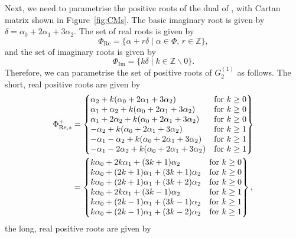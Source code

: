 \documentclass[10pt,a4paper]{amsart}
\numberwithin{equation}{section}
\theoremstyle{definition}
\newcommand{\Z}{\mathbb{Z}}
\begin{document}
Next, we need to parametrise the positive roots of the dual  of , with Cartan matrix shown in Figure~\ref{fig:CMs}. The basic imaginary root is given by $\delta = \alpha_0 + 2\alpha_1 + 3\alpha_2$. The set of real roots is given by
\[
\Phi_{\mathrm{Re}} = \{\alpha + r\delta \mid \alpha\in\Phi,\, r\in \Z\},
\]
and the set of imaginary roots is given by
\[
\Phi_{\mathrm{Im}} = \{k\delta \mid k\in \Z \backslash 0\}.
\]
Therefore, we can parametrise the set of positive roots of $G_2^{(1)}$ as follows. The short, real positive roots are given by
\begin{align*}
\Phi_{\mathrm{Re},s}^{+} &=
\left\{
\begin{array}{@{}ll@{}}
 \alpha_2 + k(\alpha_0 + 2\alpha_1 + 3\alpha_2) & \text{for} \ k \geq 0 \\
 \alpha_1 + \alpha_2 + k(\alpha_0 + 2\alpha_1 + 3\alpha_2) & \text{for} \  k \geq 0 \\
 \alpha_1 + 2\alpha_2 + k(\alpha_0 + 2\alpha_1 + 3\alpha_2) & \text{for} \  k \geq 0 \\
 -\alpha_2 + k(\alpha_0 + 2\alpha_1 + 3\alpha_2) & \text{for} \  k \geq 1 \\
 -\alpha_1 - \alpha_2 + k(\alpha_0 + 2\alpha_1 + 3\alpha_2) & \text{for} \  k \geq 1 \\
 -\alpha_1 - 2\alpha_2 + k(\alpha_0 + 2\alpha_1 + 3\alpha_2) & \text{for} \  k \geq 1
\end{array}
\right\} \\
&=
\left\{
\begin{array}{@{}ll@{}}
 k\alpha_0 + 2k\alpha_1 + (3k+1)\alpha_2 & \text{for} \  k \geq 0 \\
 k\alpha_0 + (2k+1)\alpha_1 + (3k+1)\alpha_2 & \text{for} \  k \geq 0 \\
 k\alpha_0 + (2k+1)\alpha_1 + (3k+2)\alpha_2 & \text{for} \  k \geq 0 \\
 k\alpha_0 + 2k\alpha_1 + (3k-1)\alpha_2 & \text{for} \  k \geq 1 \\
 k\alpha_0 + (2k-1)\alpha_1 + (3k-1)\alpha_2 & \text{for} \  k \geq 1 \\
 k\alpha_0 + (2k-1)\alpha_1 + (3k-2)\alpha_2 & \text{for} \  k \geq 1
\end{array}
\right\},
\end{align*}
the long, real positive roots are given by
\end{document}
